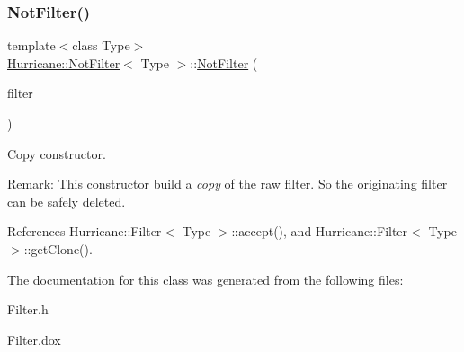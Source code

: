 \subsubsection{\texorpdfstring{Not\+Filter()}{NotFilter()}\hspace{0.1cm}{\footnotesize\ttfamily [2/2]}}
{\footnotesize\ttfamily template$<$class Type$>$ \\
\hyperlink{classHurricane_1_1NotFilter}{Hurricane\+::\+Not\+Filter}$<$ Type $>$\+::\hyperlink{classHurricane_1_1NotFilter}{Not\+Filter} (\begin{DoxyParamCaption}\item[{const \hyperlink{classHurricane_1_1NotFilter}{Not\+Filter}$<$ Type $>$ \&}]{filter }\end{DoxyParamCaption})\hspace{0.3cm}{\ttfamily [inline]}}

Copy constructor.

\begin{DoxyParagraph}{Remark\+:}
This constructor build a {\itshape copy} of the raw filter. So the originating filter can be safely deleted. 
\end{DoxyParagraph}


References Hurricane\+::\+Filter$<$ Type $>$\+::accept(), and Hurricane\+::\+Filter$<$ Type $>$\+::get\+Clone().



The documentation for this class was generated from the following files\+:\begin{DoxyCompactItemize}
\item 
Filter.\+h\item 
Filter.\+dox\end{DoxyCompactItemize}
